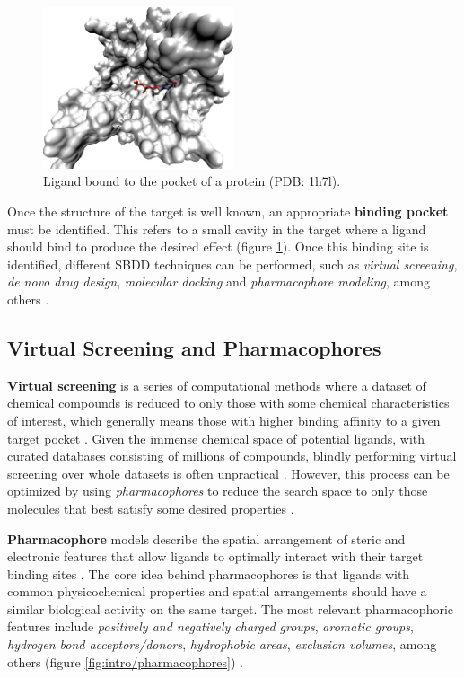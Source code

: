     \begin{figure}[H]
      \centering
      \includegraphics[width=0.5\textwidth]{figures/intro/pocket.png}
      \caption{\label{fig:intro/pocket} Ligand bound to the pocket of a protein (PDB: 1h7l).}
    \end{figure}

    Once the structure of the target is well known, an appropriate \textbf{binding pocket} must be identified. This refers to a small cavity in the target where a ligand should bind to produce the desired effect (figure \ref{fig:intro/pocket}). Once this binding site is identified, different SBDD techniques can be performed, such as \textit{virtual screening}, \textit{de novo drug design}, \textit{molecular docking} and \textit{pharmacophore modeling}, among others \cite{drug_discovery_2014, structure_based_2019, pharmacophore_and_VS_2022}.

  \subsection{Virtual Screening and Pharmacophores}
    \textbf{Virtual screening} is a series of computational methods where a dataset of chemical compounds is reduced to only those with some chemical characteristics of interest, which generally means those with higher binding affinity to a given target pocket \cite{pharmacophore_and_VS_2022, virtual_screening_2019}. Given the immense chemical space of potential ligands, with curated databases consisting of millions of compounds, blindly performing virtual screening over whole datasets is often unpractical \cite{virtual_screening_2013}. However, this process can be optimized by using \textit{pharmacophores} to reduce the search space to only those molecules that best satisfy some desired properties \cite{pharmacophore_and_VS_2022}.

    \textbf{Pharmacophore} models describe the spatial arrangement of steric and electronic features that allow ligands to optimally interact with their target binding sites \cite{pharmacophore_and_VS_2022, virtual_screening_2019, pharmacophore_modeling_2022, drug_discovery_2014}. The core idea behind pharmacophores is that ligands with common physicochemical properties and spatial arrangements should have a similar biological activity on the same target. The most relevant pharmacophoric features include \textit{positively and negatively charged groups}, \textit{aromatic groups}, \textit{hydrogen bond acceptors/donors}, \textit{hydrophobic areas}, \textit{exclusion volumes}, among others (figure \ref{fig:intro/pharmacophores}) \cite{pharmacophore_and_VS_2022, drug_discovery_2014}.

